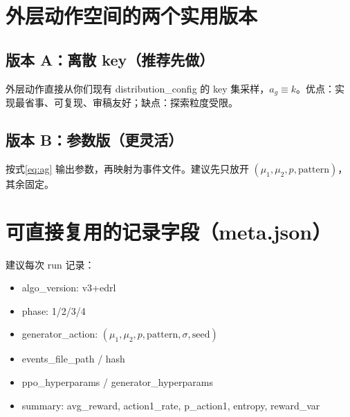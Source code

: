\documentclass[UTF8,11pt,a4paper]{ctexart}
\begin{document}
\appendix
\section{外层动作空间的两个实用版本}
\subsection{版本 A：离散 key（推荐先做）}
外层动作直接从你们现有 distribution\_config 的 key 集采样，$a_g\equiv k$。优点：实现最省事、可复现、审稿友好；缺点：探索粒度受限。

\subsection{版本 B：参数版（更灵活）}
按式\eqref{eq:ag} 输出参数，再映射为事件文件。建议先只放开 $(\mu_1,\mu_2,p,\text{pattern})$，其余固定。

\section{可直接复用的记录字段（meta.json）}
建议每次 run 记录：
\begin{itemize}
\item algo\_version: v3+edrl
\item phase: 1/2/3/4
\item generator\_action: $(\mu_1,\mu_2,p,\text{pattern},\sigma,\text{seed})$
\item events\_file\_path / hash
\item ppo\_hyperparams / generator\_hyperparams
\item summary: avg\_reward, action1\_rate, p\_action1, entropy, reward\_var
\end{itemize}
\end{document}
